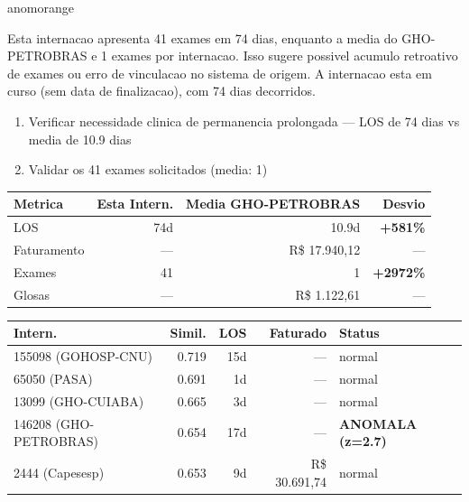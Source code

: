 \documentclass[a4paper,10pt]{article}
\begin{document}
\begin{anomalycard}[Internacao 161245 | GHO-PETROBRAS | ALTO (z=3.79)]{anomorange}
\vspace{2pt}\begin{tcolorbox}[colback=severityred!20,colframe=anomorange,title={\textbf{Interpretacao de Negocio}},fonttitle=\bfseries\small,left=4pt,right=4pt,top=3pt,bottom=3pt]
{\small Esta internacao apresenta 41 exames em 74 dias, enquanto a media do GHO-PETROBRAS e 1 exames por internacao. Isso sugere possivel acumulo retroativo de exames ou erro de vinculacao no sistema de origem. A internacao esta em curso (sem data de finalizacao), com 74 dias decorridos.}
\end{tcolorbox}
\begin{tcolorbox}[colback=severityyellow!30,colframe=anomorange,title={\textbf{Recomendacoes Especificas}},fonttitle=\bfseries\small,left=4pt,right=4pt,top=3pt,bottom=3pt]
\begin{enumerate}[nosep,leftmargin=16pt]
\item {\small Verificar necessidade clinica de permanencia prolongada --- LOS de 74 dias vs media de 10.9 dias}
\item {\small Validar os 41 exames solicitados (media: 1)}
\end{enumerate}
\end{tcolorbox}
\begin{center}\begin{tabular}{l r r r}\toprule\textbf{Metrica} & \textbf{Esta Intern.} & \textbf{Media GHO-PETROBRAS} & \textbf{Desvio} \\\midrule
LOS & 74d & 10.9d & \textcolor{anomred}{\textbf{+581\%}} \\
Faturamento & --- & R\$ 17.940,12 & --- \\
Exames & 41 & 1 & \textcolor{anomred}{\textbf{+2972\%}} \\
Glosas & --- & R\$ 1.122,61 & --- \\
\bottomrule\end{tabular}\end{center}

\begin{tabular}{l r r r l}\toprule\textbf{Intern.} & \textbf{Simil.} & \textbf{LOS} & \textbf{Faturado} & \textbf{Status} \\\midrule
155098 (GOHOSP-CNU) & 0.719 & 15d & --- & \textcolor{jcubeblue}{normal} \\
65050 (PASA) & 0.691 & 1d & --- & \textcolor{jcubeblue}{normal} \\
13099 (GHO-CUIABA) & 0.665 & 3d & --- & \textcolor{jcubeblue}{normal} \\
146208 (GHO-PETROBRAS) & 0.654 & 17d & --- & \textcolor{anomred}{\textbf{ANOMALA (z=2.7)}} \\
2444 (Capesesp) & 0.653 & 9d & R\$ 30.691,74 & \textcolor{jcubeblue}{normal} \\
\bottomrule\end{tabular}


\end{anomalycard}
\end{document}
